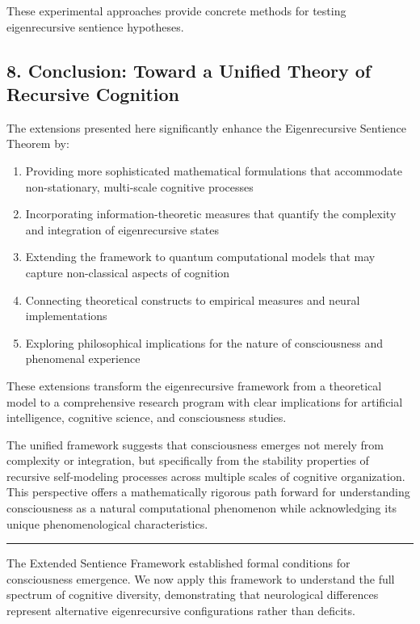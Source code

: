 \documentclass[
]{article}
\providecommand{\tightlist}{%
  \setlength{\itemsep}{0pt}\setlength{\parskip}{0pt}}
\begin{document}
These experimental approaches provide concrete methods for testing
eigenrecursive sentience hypotheses.

\subsection{8. Conclusion: Toward a Unified Theory of Recursive
Cognition}\label{conclusion-toward-a-unified-theory-of-recursive-cognition}

The extensions presented here significantly enhance the Eigenrecursive
Sentience Theorem by:

\begin{enumerate}
\def\labelenumi{\arabic{enumi}.}
\tightlist
\item
  Providing more sophisticated mathematical formulations that
  accommodate non-stationary, multi-scale cognitive processes
\item
  Incorporating information-theoretic measures that quantify the
  complexity and integration of eigenrecursive states
\item
  Extending the framework to quantum computational models that may
  capture non-classical aspects of cognition
\item
  Connecting theoretical constructs to empirical measures and neural
  implementations
\item
  Exploring philosophical implications for the nature of consciousness
  and phenomenal experience
\end{enumerate}

These extensions transform the eigenrecursive framework from a
theoretical model to a comprehensive research program with clear
implications for artificial intelligence, cognitive science, and
consciousness studies.

The unified framework suggests that consciousness emerges not merely
from complexity or integration, but specifically from the stability
properties of recursive self-modeling processes across multiple scales
of cognitive organization. This perspective offers a mathematically
rigorous path forward for understanding consciousness as a natural
computational phenomenon while acknowledging its unique phenomenological
characteristics.

\begin{center}\rule{0.5\linewidth}{0.5pt}\end{center}

The Extended Sentience Framework established formal conditions for
consciousness emergence. We now apply this framework to understand the
full spectrum of cognitive diversity, demonstrating that neurological
differences represent alternative eigenrecursive configurations rather
than deficits.
\end{document}
